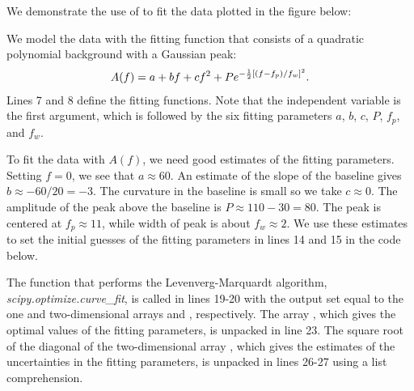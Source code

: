 \documentclass[letterpaper,10pt,english]{sphinxmanual}
\begin{document}
We demonstrate the use of  to fit the data plotted in the figure below:
\begin{figure}[htbp]
\centering

\label{chap8/chap8_fitting:fig-spectrum}\end{figure}

We model the data with the fitting function that consists of a quadratic polynomial background with a Gaussian peak:
\begin{gather}
\begin{split}A(f) = a + bf + cf^2 + P e^{-\frac{1}{2}[(f-f_p)/f_w]^2} .\end{split}\notag
\end{gather}
Lines 7 and 8 define the fitting functions.  Note that the independent variable  is the first argument, which is followed by the six fitting parameters \(a\), \(b\), \(c\), \(P\), \(f_p\), and \(f_w\).

To fit the data with \(A(f)\), we need good estimates of the fitting parameters.  Setting \(f=0\), we see that \(a \approx 60\).  An estimate of the slope of the baseline gives \(b \approx -60/20=-3\).  The curvature in the baseline is small so we take \(c \approx 0\).  The amplitude of the peak above the baseline is \(P \approx 110-30=80\).  The peak is centered at \(f_p \approx 11\), while width of peak is about \(f_w \approx 2\).  We use these estimates to set the initial guesses of the fitting parameters in lines 14 and 15 in the code below.

The function that performs the Levenverg-Marquardt algorithm, \emph{scipy.optimize.curve\_fit}, is called in lines 19-20 with the output set equal to the one and two-dimensional arrays  and , respectively.  The array , which gives the optimal values of the  fitting parameters, is unpacked in line 23.  The square root of the diagonal of the two-dimensional array , which gives the estimates of the uncertainties in the fitting parameters, is unpacked in lines 26-27 using a list comprehension.
\end{document}
